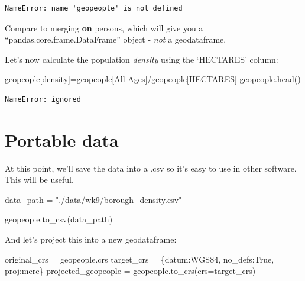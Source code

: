 \documentclass[
  letterpaper,
  DIV=11,
  numbers=noendperiod]{scrreprt}
\newenvironment{Shaded}{\begin{snugshade}}{\end{snugshade}}
\newcommand{\NormalTok}[1]{\textcolor[rgb]{0.00,0.23,0.31}{#1}}
\newcommand{\OperatorTok}[1]{\textcolor[rgb]{0.37,0.37,0.37}{#1}}
\newcommand{\StringTok}[1]{\textcolor[rgb]{0.13,0.47,0.30}{#1}}
\newcommand{\VariableTok}[1]{\textcolor[rgb]{0.07,0.07,0.07}{#1}}
\begin{document}
\begin{verbatim}
NameError: name 'geopeople' is not defined
\end{verbatim}

Compare to merging \textbf{on} persons, which will give you a
``pandas.core.frame.DataFrame'' object - \emph{not} a geodataframe.

Let's now calculate the population \emph{density} using the `HECTARES'
column:

\begin{Shaded}
\begin{Highlighting}[]
\NormalTok{geopeople[}\StringTok{\textquotesingle{}density\textquotesingle{}}\NormalTok{]}\OperatorTok{=}\NormalTok{geopeople[}\StringTok{\textquotesingle{}All Ages\textquotesingle{}}\NormalTok{]}\OperatorTok{/}\NormalTok{geopeople[}\StringTok{\textquotesingle{}HECTARES\textquotesingle{}}\NormalTok{]}
\NormalTok{geopeople.head()}
\end{Highlighting}
\end{Shaded}

\begin{verbatim}
NameError: ignored
\end{verbatim}

\hypertarget{portable-data}{%
\section{Portable data}\label{portable-data}}

At this point, we'll save the data into a .csv so it's easy to use in
other software. This will be useful.

\begin{Shaded}
\begin{Highlighting}[]
\NormalTok{data\_path }\OperatorTok{=} \StringTok{"./data/wk9/borough\_density.csv"}

\NormalTok{geopeople.to\_csv(data\_path)}
\end{Highlighting}
\end{Shaded}

And let's project this into a new geodataframe:

\begin{Shaded}
\begin{Highlighting}[]
\NormalTok{original\_crs }\OperatorTok{=}\NormalTok{ geopeople.crs}
\NormalTok{target\_crs }\OperatorTok{=}\NormalTok{ \{}\StringTok{\textquotesingle{}datum\textquotesingle{}}\NormalTok{:}\StringTok{\textquotesingle{}WGS84\textquotesingle{}}\NormalTok{, }\StringTok{\textquotesingle{}no\_defs\textquotesingle{}}\NormalTok{:}\VariableTok{True}\NormalTok{, }\StringTok{\textquotesingle{}proj\textquotesingle{}}\NormalTok{:}\StringTok{\textquotesingle{}merc\textquotesingle{}}\NormalTok{\}}
\NormalTok{projected\_geopeople }\OperatorTok{=}\NormalTok{ geopeople.to\_crs(crs}\OperatorTok{=}\NormalTok{target\_crs)}
\end{Highlighting}
\end{Shaded}
\end{document}
